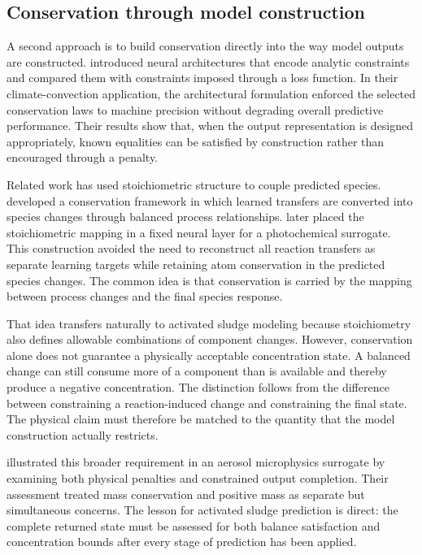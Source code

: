 \subsection{Conservation through model construction}

A second approach is to build conservation directly into the way model outputs are constructed. \citet{Beucler2021} introduced neural architectures that encode analytic constraints and compared them with constraints imposed through a loss function. In their climate-convection application, the architectural formulation enforced the selected conservation laws to machine precision without degrading overall predictive performance. Their results show that, when the output representation is designed appropriately, known equalities can be satisfied by construction rather than encouraged through a penalty.

Related work has used stoichiometric structure to couple predicted species. \citet{SturmWexler2020} developed a conservation framework in which learned transfers are converted into species changes through balanced process relationships. \citet{SturmWexler2022} later placed the stoichiometric mapping in a fixed neural layer for a photochemical surrogate. This construction avoided the need to reconstruct all reaction transfers as separate learning targets while retaining atom conservation in the predicted species changes. The common idea is that conservation is carried by the mapping between process changes and the final species response.

That idea transfers naturally to activated sludge modeling because stoichiometry also defines allowable combinations of component changes. However, conservation alone does not guarantee a physically acceptable concentration state. A balanced change can still consume more of a component than is available and thereby produce a negative concentration. The distinction follows from the difference between constraining a reaction-induced change and constraining the final state. The physical claim must therefore be matched to the quantity that the model construction actually restricts.

\citet{Harder2022} illustrated this broader requirement in an aerosol microphysics surrogate by examining both physical penalties and constrained output completion. Their assessment treated mass conservation and positive mass as separate but simultaneous concerns. The lesson for activated sludge prediction is direct: the complete returned state must be assessed for both balance satisfaction and concentration bounds after every stage of prediction has been applied.


